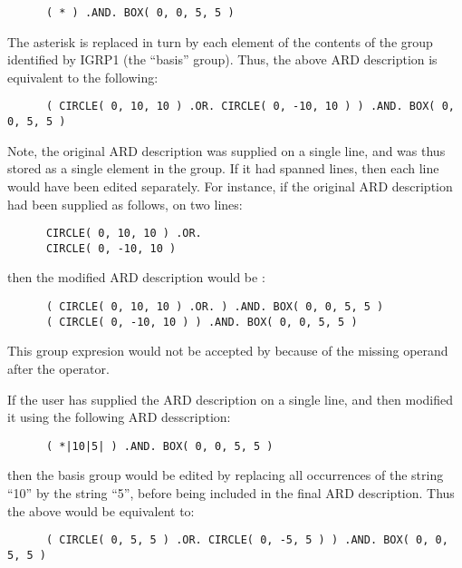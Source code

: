 \small
\begin{verbatim}
      ( * ) .AND. BOX( 0, 0, 5, 5 )
\end{verbatim}
\normalsize

The asterisk is replaced in turn by each element of the contents of the 
group identified by IGRP1 (the ``basis'' group). 
Thus, the above ARD description is equivalent to the following:

\small
\begin{verbatim}
      ( CIRCLE( 0, 10, 10 ) .OR. CIRCLE( 0, -10, 10 ) ) .AND. BOX( 0, 0, 5, 5 )
\end{verbatim}
\normalsize

Note, the original ARD description was supplied on a single line, and was
thus stored as a single element in the group. If it had spanned lines,
then each line would have been edited separately. For instance, if the
original ARD description had been supplied as follows, on two lines:

\small
\begin{verbatim}
      CIRCLE( 0, 10, 10 ) .OR. 
      CIRCLE( 0, -10, 10 )
\end{verbatim}
\normalsize

then the modified ARD description would be :

\small
\begin{verbatim}
      ( CIRCLE( 0, 10, 10 ) .OR. ) .AND. BOX( 0, 0, 5, 5 )
      ( CIRCLE( 0, -10, 10 ) ) .AND. BOX( 0, 0, 5, 5 )
\end{verbatim}
\normalsize

This group expresion would not be accepted by 
because of the missing operand after the  operator.

If the user has supplied the ARD description on a single line, and then
modified it using the following ARD desscription:

\small
\begin{verbatim}
      ( *|10|5| ) .AND. BOX( 0, 0, 5, 5 )
\end{verbatim}
\normalsize

then the basis group would be edited by replacing all occurrences of the
string ``10'' by the string ``5'', before being included in the final ARD
description. Thus the above would be equivalent to:

\small
\begin{verbatim}
      ( CIRCLE( 0, 5, 5 ) .OR. CIRCLE( 0, -5, 5 ) ) .AND. BOX( 0, 0, 5, 5 )
\end{verbatim}
\normalsize

